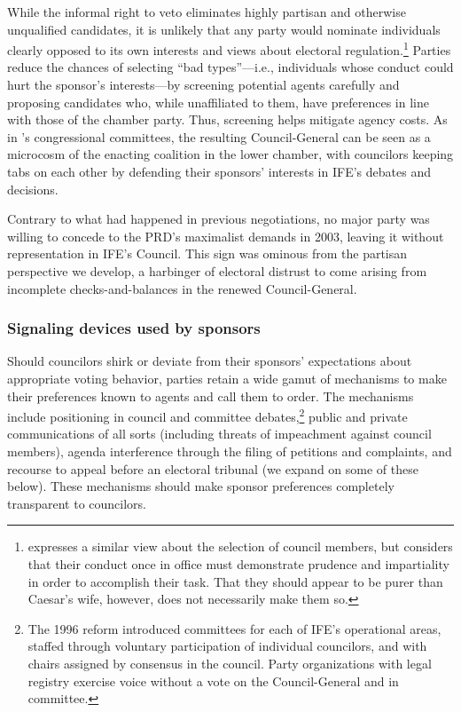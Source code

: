 \documentclass[12 pt, letter]{article}
\begin{document}
While the informal right to veto eliminates highly partisan and otherwise unqualified candidates, it is unlikely that any party would nominate individuals clearly opposed to its own interests and views about electoral regulation.\footnote{\citet{Schedler2000a} expresses a similar view about the selection of council members, but considers that their conduct once in office must demonstrate prudence and impartiality in order to accomplish their task.  That they should appear to be purer than Caesar's wife, however, does not necessarily make them so.} Parties reduce the chances of selecting ``bad types''---i.e., individuals whose conduct could hurt the sponsor's interests---by screening potential agents carefully and proposing candidates who, while unaffiliated to them, have preferences in line with those of the chamber party.  Thus, screening helps mitigate agency costs.  As in \citeauthor*{Cox1993}'s \citeyearpar{Cox1993} congressional committees, the resulting Council-General can be seen as a microcosm of the enacting coalition in the lower chamber, with councilors keeping tabs on each other by defending their sponsors' interests in IFE's debates and decisions.

Contrary to what had happened in previous negotiations, no major party was willing to concede to the PRD's maximalist demands in 2003, leaving it without representation in IFE's Council.  This sign was ominous from the partisan perspective we develop, a harbinger of electoral distrust to come arising from incomplete checks-and-balances in the renewed Council-General.

\subsubsection{Signaling devices used by sponsors}
Should councilors shirk or deviate from their sponsors' expectations about appropriate voting behavior, parties retain a wide gamut of mechanisms to make their preferences known to agents and call them to order.  The mechanisms include positioning in council and committee debates,\footnote{The 1996 reform introduced committees for each of IFE's operational areas, staffed through voluntary participation of individual councilors, and with chairs assigned by consensus in the council. Party organizations with legal registry exercise voice without a vote on the Council-General and in committee.} public and private communications of all sorts (including threats of impeachment against council members), agenda interference through the filing of petitions and complaints, and recourse to appeal before an electoral tribunal (we expand on some of these below).  These mechanisms should make sponsor preferences completely transparent to councilors.
\end{document}
